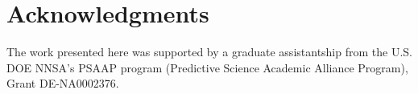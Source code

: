 \documentclass{anstrans}
\begin{document}
\section{Acknowledgments}
The work presented here was supported by a graduate assistantship from the U.S. DOE NNSA's PSAAP program (Predictive Science Academic Alliance Program), Grant DE-NA0002376.  



\end{document}
